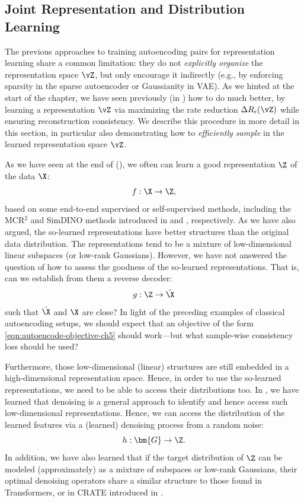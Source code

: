 \documentclass[../../book-main.tex]{subfiles}
\begin{document}
\subsection{Joint Representation and Distribution Learning}
\label{sec:RAE}

The previous approaches to training autoencoding pairs for representation
learning share a common limitation: they do not \textit{explicitly organize} the
representation space $\vZ$, but only encourage it indirectly (e.g., by enforcing
sparsity in the sparse autoencoder or Gaussianity in VAE). As we hinted at the start of the chapter, we have seen previously (in ) how to do much better, by learning a representation $\vZ$ via maximizing the rate reduction $\Delta
R_{\epsilon}(\vZ)$ while ensuring reconstruction consistency. We describe this
procedure in more detail in this section, in particular also demonstrating how
to \textit{efficiently sample} in the learned representation space $\vZ$.

As we have seen at the end of  (), we often can learn a good
representation $\Z$ of the data $\X$:
\begin{equation}
    f: \X \rightarrow \Z,
\end{equation}
based on some end-to-end supervised or self-supervised methods, including the
MCR$^2$ and SimDINO methods introduced in 
and , respectively. As we have also argued, the
so-learned representations
have better structures than the original data distribution. The representations
tend to be a mixture of low-dimensional linear subspaces (or low-rank
Gaussians). However, we have not answered the question of how to assess the
goodness of the so-learned representations. That is, can we establish from them
a reverse decoder:
\begin{equation}
    g: \Z \rightarrow \hat{\X}
\end{equation}
such that $\hat \X$ and $\X$ are close? In light of the preceding examples of
classical autoencoding setups, we should expect that an objective of the form
\eqref{eqn:autoencode-objective-ch5} should work---but what sample-wise
consistency loss should be used?

Furthermore, those low-dimensional (linear) structures are still embedded in
a high-dimensional representation space. Hence, in order to use the so-learned
representations, we need to be able to access their distributions too. In
, we have learned that denoising is a general approach
to identify and hence access such low-dimensional representations. Hence,
we can access the distribution of the learned features via a
(learned) denoising process from a random noise:
\begin{equation}
    h: \bm{G} \rightarrow \Z.
\end{equation}
In addition, we have also
learned that if the target distribution of $\Z$ can be modeled
(approximately) as
a mixture of subspaces or low-rank Gaussians, their optimal denoising operators
share a similar structure to those found in Transformers, or in CRATE
introduced in .
\end{document}

